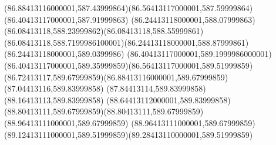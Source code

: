 {{	\curveto(86.88413116000001,587.43999864)(86.56413117000001,587.59999864)(86.40413117000001,587.91999863)
	\curveto(86.24413118000001,588.07999863)(86.08413118,588.23999862)(86.08413118,588.55999861)
	\curveto(86.08413118,588.7199986100001)(86.24413118000001,588.87999861)(86.24413118000001,589.0399986)
	\curveto(86.40413117000001,589.1999986000001)(86.40413117000001,589.35999859)(86.56413117000001,589.51999859)
	\curveto(86.72413117,589.67999859)(86.88413116000001,589.67999859)(87.04413116,589.83999858)
	\lineto(87.84413114,589.83999858)
	\lineto(88.16413113,589.83999858)
	\lineto(88.64413112000001,589.83999858)
	\curveto(88.80413111,589.67999859)(88.80413111,589.67999859)(88.96413111000001,589.67999859)
	\curveto(88.96413111000001,589.67999859)(89.12413111000001,589.51999859)(89.28413110000001,589.51999859)
	\closepath
}
}
{
}
